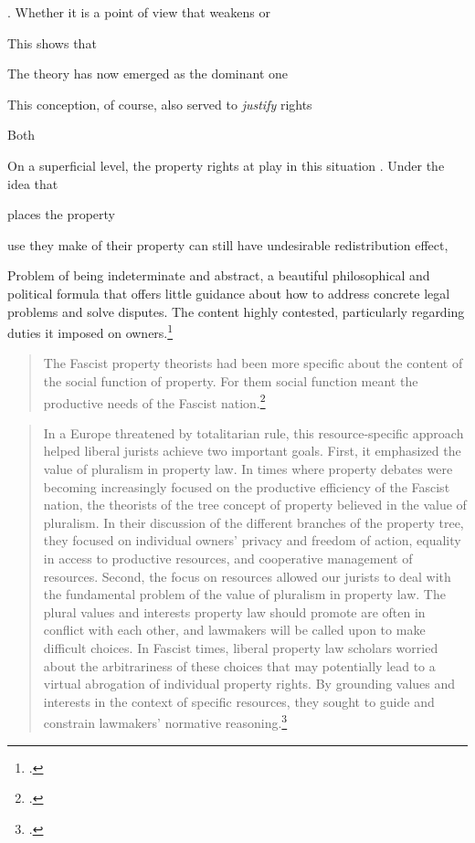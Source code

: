 . Whether it is a point of view that weakens or 


This shows that 

The theory has now emerged as the dominant one


This conception, of course, also served to {\it justify}  rights 

Both 


On a superficial level, the property rights at play in this situation . Under the idea that 

 places the property 

 use they make of their property can still have undesirable redistribution effect, 



Problem of being indeterminate and abstract, a beautiful philosophical and political formula that offers little guidance about how to address concrete legal problems and solve disputes. The content highly contested, particularly regarding duties it imposed on owners.\footcite[908]{robilant13}

\begin{quote}
The Fascist property theorists had been more specific about the content of the social function of property. For them social function meant the productive needs of the Fascist nation.\footcite[909]{robilant13}
\end{quote}

\begin{quote}
In a Europe threatened by totalitarian
rule, this resource-specific approach helped liberal jurists achieve two
important goals. First, it emphasized the value of pluralism in property law. In
times where property debates were becoming increasingly
focused on the productive efficiency of the Fascist nation, the
theorists of the tree concept of property believed in the
value of pluralism. In their discussion of the different branches of the property tree,
they focused on individual owners' privacy and freedom of action, equality in access to productive resources, and cooperative management of resources. Second, the focus on resources allowed our jurists to deal with
the fundamental problem of the value of pluralism in property law. The plural values and interests property law should promote are often in conflict with each other, and lawmakers will be called upon to make
difficult choices. In Fascist times, liberal property law scholars worried about the arbitrariness of these choices that may potentially
lead to a virtual abrogation of individual property rights. By grounding values and interests in the context of specific resources, they sought to guide and constrain lawmakers' normative reasoning.\footcite[910-911]{robilant13}
\end{quote}

